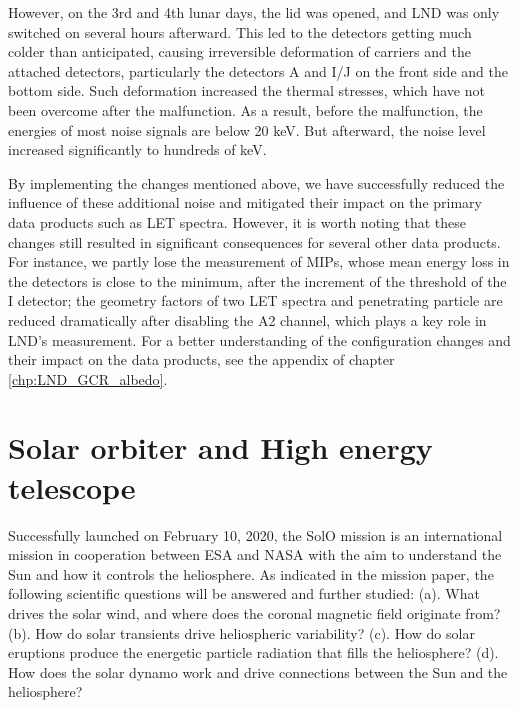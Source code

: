 However, on the 3rd and 4th lunar days, the lid was opened, and \ac{LND} was only switched on several hours afterward. This led to the detectors getting much colder than anticipated, causing irreversible deformation of carriers and the attached detectors, particularly the detectors A and I/J on the front side and the bottom side. Such deformation increased the thermal stresses, which have not been overcome after the malfunction. As a result, before the malfunction, the energies of most noise signals are below 20 keV. But afterward, the noise level increased significantly to hundreds of keV.

By implementing the changes mentioned above, we have successfully reduced the influence of these additional noise and mitigated their impact on the primary data products such as \ac{LET} spectra. However, it is worth noting that these changes still resulted in significant consequences for several other data products. For instance, we partly lose the measurement of \acp{MIP}, whose mean energy loss in the detectors is close to the minimum, after the increment of the threshold of the I detector; the geometry factors of two \ac{LET} spectra and penetrating particle are reduced dramatically after disabling the A2 channel, which plays a key role in \ac{LND}'s measurement. For a better understanding of the configuration changes and their impact on the data products, see the appendix of chapter \ref{chp:LND_GCR_albedo}.

\section {Solar orbiter and High energy telescope}
\label{sec:Solar_Orbiter}
Successfully launched on February 10, 2020, the \ac{SolO} mission \citep{Mueller-2020-SolO} is an international mission in cooperation between \ac{ESA} and \ac{NASA} with the aim to understand the Sun and how it controls the heliosphere. As indicated in the mission paper, the following scientific questions will be answered and further studied: (a). What drives the solar wind, and where does the coronal magnetic field originate from? (b). How do solar transients drive heliospheric variability? (c). How do solar eruptions produce the energetic particle radiation that fills the heliosphere? (d). How does the solar dynamo work and drive connections between the Sun and the heliosphere?

